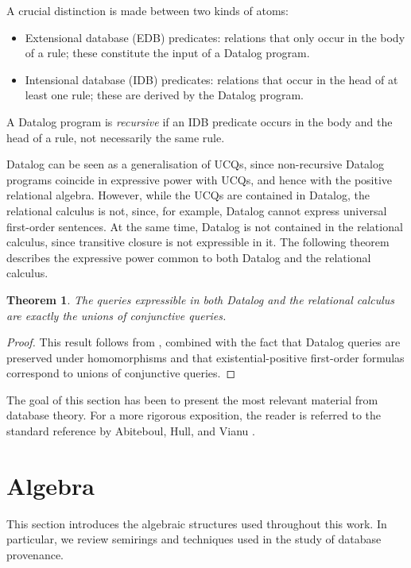 \documentclass[oneside, 11pt]{amsbook}
\theoremstyle{plain}
\newtheorem{thm}{Theorem}[section]
\theoremstyle{definition}
\theoremstyle{remark}
\begin{document}
A crucial distinction is made between two kinds of atoms:
\begin{itemize}
    \item Extensional database (EDB) predicates: relations that only occur in the body of a rule; these constitute the input of a Datalog program.
    \item Intensional database (IDB) predicates: relations that occur in the head of at least one rule; these are derived by the Datalog program.
\end{itemize}

A Datalog program is \emph{recursive} if an IDB predicate occurs in the body and the head of a rule, not necessarily the same rule.

Datalog can be seen as a generalisation of UCQs, since non-recursive Datalog programs coincide in expressive power with UCQs, and hence with the positive relational algebra. However, while the UCQs are contained in Datalog, the relational calculus is not, since, for example, Datalog cannot express universal first-order sentences. At the same time, Datalog is not contained in the relational calculus, since transitive closure is not expressible in it. The following theorem describes the expressive power common to both Datalog and the relational calculus.

\begin{thm}
    The queries expressible in both Datalog and the relational calculus are exactly the unions of conjunctive queries.
\end{thm}
\begin{proof}
    This result follows from \cite[Theorem 1.7]{Rossman2008}, combined with the fact that Datalog queries are preserved under homomorphisms and that existential-positive first-order formulas correspond to unions of conjunctive queries.
\end{proof}

The goal of this section has been to present the most relevant material from database theory. For a more rigorous exposition, the reader is referred to the standard reference by Abiteboul, Hull, and Vianu \cite{Abiteboul1995}.

\section{Algebra}

This section introduces the algebraic structures used throughout this work. In particular, we review semirings and techniques used in the study of database provenance.
\end{document}
